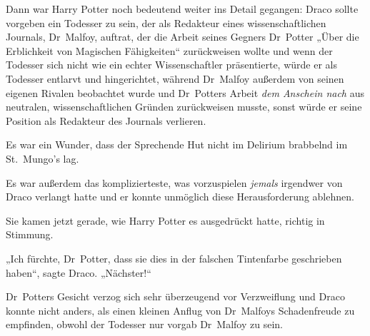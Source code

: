 Dann war Harry Potter noch bedeutend weiter ins Detail gegangen: Draco sollte vorgeben ein Todesser zu sein, der als Redakteur eines wissenschaftlichen Journals, Dr~Malfoy, auftrat, der die Arbeit seines Gegners Dr~Potter „Über die Erblichkeit von Magischen Fähigkeiten“ zurückweisen wollte und wenn der Todesser sich nicht wie ein echter Wissenschaftler präsentierte, würde er als Todesser entlarvt und hingerichtet, während Dr~Malfoy außerdem von seinen eigenen Rivalen beobachtet wurde und Dr~Potters Arbeit \emph{dem Anschein nach} aus neutralen, wissenschaftlichen Gründen zurückweisen musste, sonst würde er seine Position als Redakteur des Journals verlieren.

Es war ein Wunder, dass der Sprechende Hut nicht im Delirium brabbelnd im St.~Mungo’s lag.

Es war außerdem das komplizierteste, was vorzuspielen \emph{jemals} irgendwer von Draco verlangt hatte und er konnte unmöglich diese Herausforderung ablehnen.

Sie kamen jetzt gerade, wie Harry Potter es ausgedrückt hatte, richtig in Stimmung.

„Ich fürchte, Dr~Potter, dass sie dies in der falschen Tintenfarbe geschrieben haben“, sagte Draco. „Nächster!“

Dr~Potters Gesicht verzog sich sehr überzeugend vor Verzweiflung und Draco konnte nicht anders, als einen kleinen Anflug von Dr~Malfoys Schadenfreude zu empfinden, obwohl der Todesser nur vorgab Dr~Malfoy zu sein.

